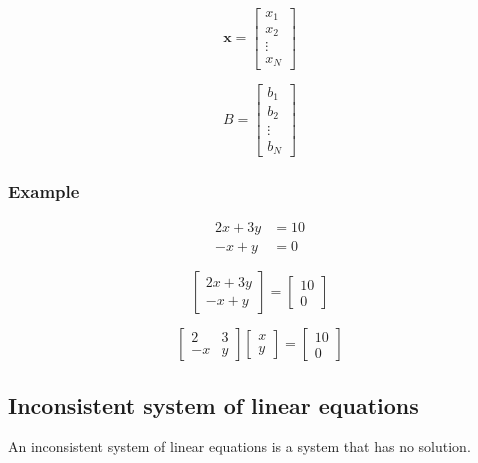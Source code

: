 \documentclass[11pt]{article}
\begin{document}
\begin{displaymath}
\boldsymbol{x} = \begin{bmatrix}
x_1 \\
x_2 \\
\vdots \\
x_N
\end{bmatrix}
\end{displaymath}

\begin{displaymath}
B = \begin{bmatrix}
b_1 \\
b_2 \\
\vdots \\
b_N
\end{bmatrix}
\end{displaymath}
\subsubsection{Example}
\label{sec:org5405fe9}
\begin{align*}
2x + 3y &= 10 \\
-x + y &= 0
\end{align*}

\begin{displaymath}
\begin{bmatrix}
2x + 3y \\
-x + y
\end{bmatrix} = \begin{bmatrix}
10 \\
0
\end{bmatrix}
\end{displaymath}

\begin{displaymath}
\begin{bmatrix}
2 & 3 \\
-x & y
\end{bmatrix} \begin{bmatrix}
x \\
y
\end{bmatrix} = \begin{bmatrix}
10 \\
0
\end{bmatrix}
\end{displaymath}
\subsection{Inconsistent system of linear equations}
\label{sec:orgc30ab81}
An inconsistent system of linear equations is a system that has no solution.
\end{document}

